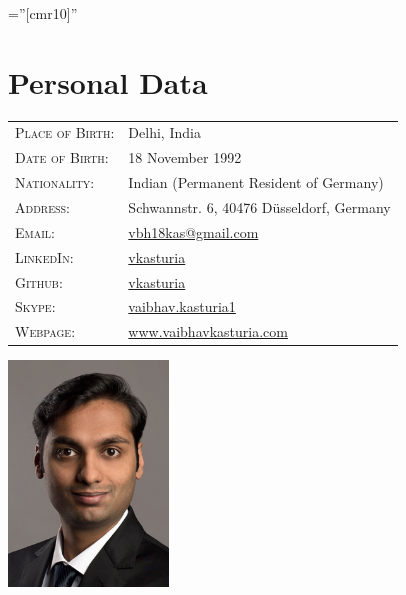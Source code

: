 \documentclass[a4paper,10pt]{article} %
\begin{document}
\pagestyle{empty} %
\font\fb=''[cmr10]'' %


\par{\bigskip\par} %

\section{Personal Data}

\begin{minipage}[b][4.5cm][t]{0.5\textwidth}
\begin{tabular}{ll}
\textsc{Place of Birth:} & Delhi, India \\ 
\textsc{Date of Birth:} & 18 November 1992 \\
\textsc{Nationality:} & Indian (Permanent Resident of Germany)\\
\textsc{Address:} & Schwannstr. 6, 40476 Düsseldorf, Germany \\
\textsc{Email:} & \href{mailto:vbh18kas@gmail.com}{vbh18kas@gmail.com} \\
\textsc{LinkedIn:} & \href{https://www.linkedin.com/in/vkasturia/}{vkasturia} \\
\textsc{Github:} & \href{https://github.com/vkasturia}{vkasturia} \\
\textsc{Skype:} & \href{https://join.skype.com/invite/apwT2EQ6iqFR}{vaibhav.kasturia1} \\
\textsc{Webpage:} & \href{https://www.vaibhavkasturia.com}{www.vaibhavkasturia.com}
\end{tabular}
\end{minipage}
\begin{minipage}[b][4.5cm][t]{0.5\textwidth}
\hspace{3.5cm}
\includegraphics[width=0.32\textwidth]{./bewerbungsbild_cropped.jpg}
\end{minipage}
\end{document}
